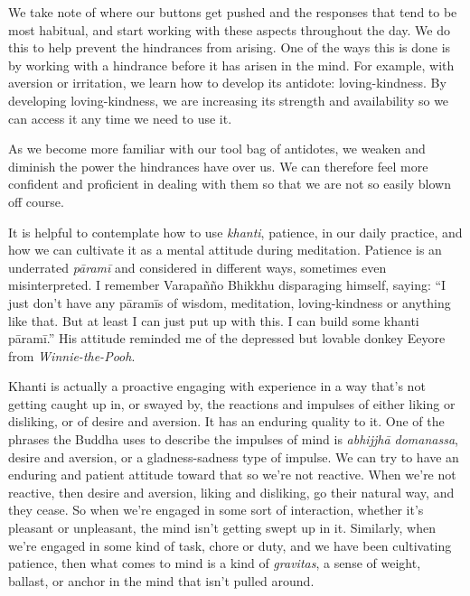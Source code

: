 We take note of where our buttons get pushed and the responses that 
tend to be most habitual, and start working with these aspects 
throughout the day. We do this to help prevent the hindrances from 
arising. One of the ways this is done is by working with a hindrance 
before it has arisen in the mind. For example, with aversion or 
irritation, we learn how to develop its antidote: loving-kindness. By 
developing loving-kindness, we are increasing its strength and 
availability so we can access it any time we need to use it.

As we become more familiar with our tool bag of antidotes, we weaken 
and diminish the power the hindrances have over us. We can therefore 
feel more confident and proficient in dealing with them so that we are 
not so easily blown off course.


It is helpful to contemplate how to use \emph{khanti}, patience, in our 
daily practice, and how we can cultivate it as a mental attitude during 
meditation. Patience is an underrated \emph{pāramī} and considered in 
different ways, sometimes even misinterpreted. I remember Varapañño 
Bhikkhu disparaging himself, saying: ``I just don't have any pāramīs 
of wisdom, meditation, loving-kindness or anything like that. But at 
least I can just put up with this. I can build some khanti pāramī.'' 
His attitude reminded me of the depressed but lovable donkey Eeyore 
from \emph{Winnie-the-Pooh}.

Khanti is actually a proactive engaging with experience in a way that's 
not getting caught up in, or swayed by, the reactions and impulses of 
either liking or disliking, or of desire and aversion. It has an 
enduring quality to it. One of the phrases the Buddha uses to describe 
the impulses of mind is \emph{abhijjhā domanassa}, desire and 
aversion, or a gladness-sadness type of impulse. We can try to have an 
enduring and patient attitude toward that so we're not reactive. When 
we're not reactive, then desire and aversion, liking and disliking, go 
their natural way, and they cease. So when we're engaged in some sort 
of interaction, whether it's pleasant or unpleasant, the mind isn't 
getting swept up in it. Similarly, when we're engaged in some kind of 
task, chore or duty, and we have been cultivating patience, then what 
comes to mind is a kind of \emph{gravitas}, a sense of weight, ballast, 
or anchor in the mind that isn't pulled around.

